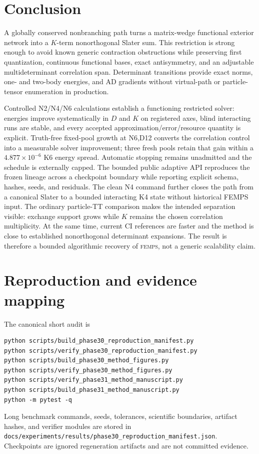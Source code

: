 \documentclass[11pt]{article}
\newcommand{\FEMPS}{\textnormal{\textsc{femps}}}
\begin{document}
\section{Conclusion}

A globally conserved nonbranching path turns a matrix-wedge functional
exterior network into a $K$-term nonorthogonal Slater sum.  This restriction is
strong enough to avoid known generic contraction obstructions while preserving
first quantization, continuous functional bases, exact antisymmetry, and an
adjustable multideterminant correlation span.  Determinant transitions provide
exact norms, one- and two-body energies, and AD gradients without virtual-path
or particle-tensor enumeration in production.

Controlled N2/N4/N6 calculations establish a functioning restricted solver:
energies improve systematically in $D$ and $K$ on registered axes, blind
interacting runs are stable, and every accepted approximation/error/resource
quantity is explicit.  Truth-free fixed-pool growth at N6,D12 converts the
correlation control into a measurable solver improvement; three fresh pools
retain that gain within a $4.877\times10^{-6}$ K6 energy spread.  Automatic
stopping remains unadmitted and the schedule is externally capped.  The
bounded public adaptive API reproduces the frozen lineage across a checkpoint
boundary while reporting explicit schema, hashes, seeds, and residuals.  The
clean N4 command further closes the path from a canonical Slater to a bounded
interacting K4 state without historical FEMPS input.  The ordinary particle-TT comparison makes the intended
separation visible: exchange support grows while $K$ remains the chosen
correlation multiplicity.  At the same time, current CI references are faster
and the method is close to established nonorthogonal determinant expansions.
The result is therefore a bounded algorithmic recovery of \FEMPS{}, not a
generic scalability claim.

\appendix
\section{Reproduction and evidence mapping}

The canonical short audit is
\begin{verbatim}
python scripts/build_phase30_reproduction_manifest.py
python scripts/verify_phase30_reproduction_manifest.py
python scripts/build_phase30_method_figures.py
python scripts/verify_phase30_method_figures.py
python scripts/verify_phase31_method_manuscript.py
python scripts/build_phase31_method_manuscript.py
python -m pytest -q
\end{verbatim}
Long benchmark commands, seeds, tolerances, scientific boundaries, artifact
hashes, and verifier modules are stored in
\texttt{docs/experiments/results/phase30\_reproduction\_manifest.json}.
Checkpoints are ignored regeneration artifacts and are not committed evidence.
\end{document}
